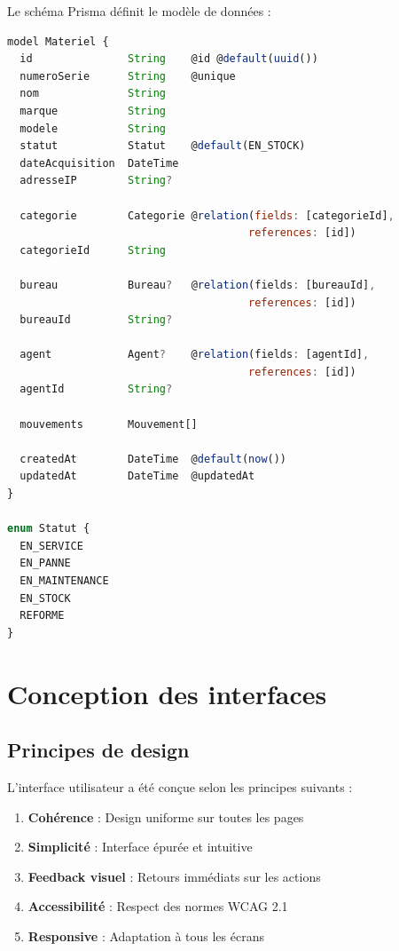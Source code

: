 \documentclass[12pt,a4paper]{report}
\begin{document}
Le schéma Prisma définit le modèle de données :

\begin{lstlisting}[language=JavaScript, caption=Extrait du schéma Prisma]
model Materiel {
  id               String    @id @default(uuid())
  numeroSerie      String    @unique
  nom              String
  marque           String
  modele           String
  statut           Statut    @default(EN_STOCK)
  dateAcquisition  DateTime
  adresseIP        String?
  
  categorie        Categorie @relation(fields: [categorieId], 
                                      references: [id])
  categorieId      String
  
  bureau           Bureau?   @relation(fields: [bureauId], 
                                      references: [id])
  bureauId         String?
  
  agent            Agent?    @relation(fields: [agentId], 
                                      references: [id])
  agentId          String?
  
  mouvements       Mouvement[]
  
  createdAt        DateTime  @default(now())
  updatedAt        DateTime  @updatedAt
}

enum Statut {
  EN_SERVICE
  EN_PANNE
  EN_MAINTENANCE
  EN_STOCK
  REFORME
}
\end{lstlisting}

\section{Conception des interfaces}

\subsection{Principes de design}

L'interface utilisateur a été conçue selon les principes suivants :

\begin{enumerate}
    \item \textbf{Cohérence} : Design uniforme sur toutes les pages
    \item \textbf{Simplicité} : Interface épurée et intuitive
    \item \textbf{Feedback visuel} : Retours immédiats sur les actions
    \item \textbf{Accessibilité} : Respect des normes WCAG 2.1
    \item \textbf{Responsive} : Adaptation à tous les écrans
\end{enumerate}
\end{document}
